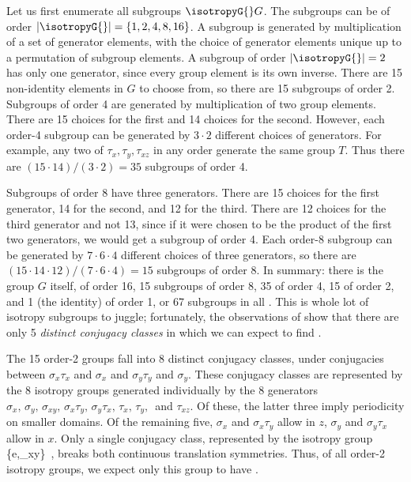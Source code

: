 Let us first enumerate all subgroups $\isotropyG{}  G$.
The subgroups can be of order
$|\isotropyG{}| = \{1,2,4,8,16\}$.
A subgroup is generated by multiplication of a set of
generator elements, with the choice of
generator elements unique up to a permutation of subgroup
elements.
A subgroup of order $|\isotropyG{}| =  2$ has only one generator,
since every group element is its own inverse. There are 15
non-identity elements in $G$ to choose from, so there are 15 subgroups
of order 2.
Subgroups of order 4 are generated by multiplication of two
group elements. There are 15 choices for the first and 14
choices for the second. However, each order-4 subgroup
can be generated by $3 \cdot 2$ different choices of generators.
For example, any two of $\tau_x, \tau_y, \tau_{xz}$ in any order
generate the same group $T$. Thus there are $(15 \cdot 14)/(3 \cdot 2) = 35$
subgroups of order 4.

Subgroups of order 8 have three generators.  There are
15 choices for the first generator, 14 for the second, and 12 for the
third. There are 12 choices for the third
generator and not  13, since if it were chosen to be the product of the
first two generators, we would get a subgroup of order 4.
Each order-8 subgroup can be generated
by $7 \cdot 6 \cdot 4$ different choices of three generators, so there are
$(15 \cdot 14 \cdot 12)/(7 \cdot 6 \cdot 4) = 15$ subgroups of order 8.
In summary: there is the group $G$ itself, of order 16,
15 subgroups of order 8, 35 of order 4, 15 of
order 2, and 1 (the identity) of order 1,
or 67 subgroups in all .
This is whole lot of isotropy subgroups to juggle; fortunately,
the observations of  show that there
are only 5 {\em distinct conjugacy classes} in which we can expect
to find \eqva.

The 15 order-2 groups fall into 8 distinct conjugacy
classes, under conjugacies between $\sigma_x \tau_x$ and $\sigma_x$
and $\sigma_y \tau_y$ and $\sigma_y$. These conjugacy classes are
represented by the 8 isotropy groups generated individually by the 8
generators
$\sigma_x,\, \sigma_y,\, \sigma_{xy},\, \sigma_x \tau_y,\,  \sigma_y \tau_x,\,
\tau_x,\, \tau_y,\,$ and $\tau_{xz}$. Of these, the latter three imply
periodicity on smaller domains. Of the remaining five,
$\sigma_x$ and $\sigma_x \tau_y$ allow {\reqva} in $z$,
$\sigma_y$ and $\sigma_y \tau_x$ allow {\reqva} in $x$.
Only a single conjugacy class, represented by the isotropy
group
\beq
  \{e,\sigma_{xy}\}
\,,
breaks both continuous translation symmetries. Thus, of all
order-2  isotropy groups, we expect only this group to have {\eqva}.

